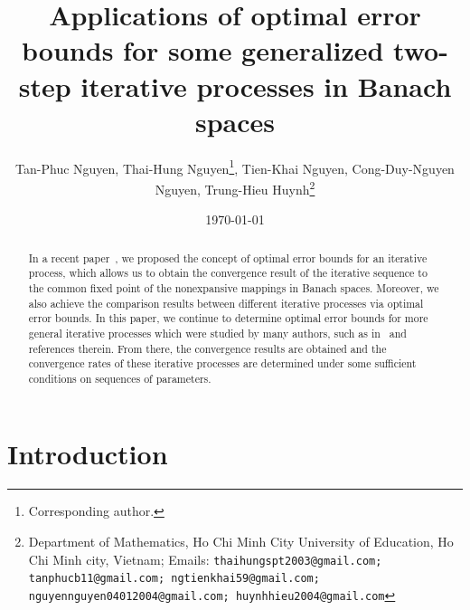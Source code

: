 \documentclass[a4paper, 11pt]{article}
\title{Applications of optimal error bounds for some generalized two-step iterative processes in Banach spaces}
\author{Tan-Phuc Nguyen, Thai-Hung Nguyen\footnote{Corresponding author.},  Tien-Khai Nguyen, Cong-Duy-Nguyen Nguyen, Trung-Hieu Huynh\thanks{Department of Mathematics, Ho Chi Minh City University of Education, Ho Chi Minh city, Vietnam; Emails: \texttt{thaihungspt2003@gmail.com; tanphucb11@gmail.com; ngtienkhai59@gmail.com; nguyennguyen04012004@gmail.com; huynhhieu2004@gmail.com}}}
\date{\today}
\begin{document}
		\large
		\maketitle
		\begin{abstract}

In a recent paper~\cite{paper2}, we proposed the concept of optimal error bounds for an iterative process, which allows us to obtain the convergence result of the iterative sequence to the common fixed point of the nonexpansive mappings in Banach spaces. Moreover, we also achieve the comparison results between different iterative processes via optimal error bounds. In this paper, we continue to determine optimal error bounds for more general iterative processes which were studied by many authors, such as in~\cite{DungHieu} and references therein. From there, the convergence results are obtained and the convergence rates of these iterative processes are determined under some sufficient conditions on sequences of parameters. 		
		
			
			\medskip
			
			\medskip
		\end{abstract}
		\tableofcontents
		
		
\section{Introduction}\label{Sec1}
\end{document}
